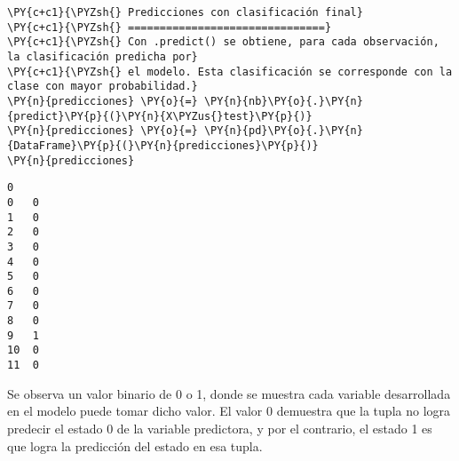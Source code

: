     \begin{tcolorbox}[breakable, size=fbox, boxrule=1pt, pad at break*=1mm,colback=cellbackground, colframe=cellborder]
\begin{Verbatim}[commandchars=\\\{\}]
\PY{c+c1}{\PYZsh{} Predicciones con clasificación final}
\PY{c+c1}{\PYZsh{} ===============================}
\PY{c+c1}{\PYZsh{} Con .predict() se obtiene, para cada observación, la clasificación predicha por}
\PY{c+c1}{\PYZsh{} el modelo. Esta clasificación se corresponde con la clase con mayor probabilidad.}
\PY{n}{predicciones} \PY{o}{=} \PY{n}{nb}\PY{o}{.}\PY{n}{predict}\PY{p}{(}\PY{n}{X\PYZus{}test}\PY{p}{)}
\PY{n}{predicciones} \PY{o}{=} \PY{n}{pd}\PY{o}{.}\PY{n}{DataFrame}\PY{p}{(}\PY{n}{predicciones}\PY{p}{)}
\PY{n}{predicciones}
\end{Verbatim}
\end{tcolorbox}

            \begin{tcolorbox}[breakable, size=fbox, boxrule=.5pt, pad at break*=1mm, opacityfill=0]
\begin{Verbatim}[commandchars=\\\{\}]
    0
0   0
1   0
2   0
3   0
4   0
5   0
6   0
7   0
8   0
9   1
10  0
11  0
\end{Verbatim}
\end{tcolorbox}
        
    Se observa un valor binario de 0 o 1, donde se muestra cada variable
desarrollada en el modelo puede tomar dicho valor. El valor 0 demuestra
que la tupla no logra predecir el estado 0 de la variable predictora, y
por el contrario, el estado 1 es que logra la predicción del estado en
esa tupla.


